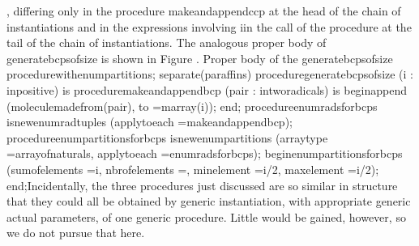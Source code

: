 \tyxffmxendmono[], differing only in the procedure %
\tyxffmxmono[]make\Symuns[]and\Symuns[]append\Symuns[]ccp%
\tyxffmxendmono[] at the head of the chain of instantiations and in
the expressions involving \tyxffmxmono[]i\tyxffmxendmono[] in the
call of the procedure at the tail of the chain of instantiations.%
\Endpara[]
\Para[]The analogous proper body of \tyxffmxmono[]generate\Symuns[]bcps\Symuns[]of\Symuns[]size%
\tyxffmxendmono[] is shown in Figure .
\Parbox[]
Proper body of
the \tyxffmxmono[]generate\Symuns[]bcps\Symuns[]of\Symuns[]size%
\tyxffmxendmono[] procedure\FgEndcap[]
\Comp[]\tyxtstxbf[]with\tyxtstxendbf[] enum\Symuns[]partitions;
\tyxtstxbf[]separate\tyxtstxendbf[] (paraffins)
\tyxtstxbf[]procedure\tyxtstxendbf[] generate\Symuns[]bcps\Symuns[]of\Symuns[]size (i : %
\tyxtstxbf[]in\tyxtstxendbf[] positive) \tyxtstxbf[]is%
\tyxtstxendbf[]
   \tyxtstxbf[]procedure\tyxtstxendbf[] make\Symuns[]and\Symuns[]append\Symuns[]bcp (pair : %
\tyxtstxbf[]in\tyxtstxendbf[] two\Symuns[]radicals) \tyxtstxbf[]is%
\tyxtstxendbf[] 
   \tyxtstxbf[]begin\tyxtstxendbf[]
      append (molecule\Symuns[]made\Symuns[]from(pair), to =\Symgt[] m\Symuns[]array(i));
   \tyxtstxbf[]end\tyxtstxendbf[];
   \tyxtstxbf[]procedure\tyxtstxendbf[] enum\Symuns[]rads\Symuns[]for\Symuns[]bcps %
\tyxtstxbf[]is\tyxtstxendbf[]
      \tyxtstxbf[]new\tyxtstxendbf[] enum\Symuns[]rad\Symuns[]tuples (apply\Symuns[]to\Symuns[]each =\Symgt[] make\Symuns[]and\Symuns[]append\Symuns[]bcp);
   \tyxtstxbf[]procedure\tyxtstxendbf[] enum\Symuns[]partitions\Symuns[]for\Symuns[]bcps %
\tyxtstxbf[]is\tyxtstxendbf[]
      \tyxtstxbf[]new\tyxtstxendbf[] enum\Symuns[]partitions (array\Symuns[]type    =\Symgt[] array\Symuns[]of\Symuns[]naturals,
                           apply\Symuns[]to\Symuns[]each =\Symgt[] enum\Symuns[]rads\Symuns[]for\Symuns[]bcps);
\tyxtstxbf[]begin\tyxtstxendbf[]
   enum\Symuns[]partitions\Symuns[]for\Symuns[]bcps (sum\Symuns[]of\Symuns[]elements =\Symgt[] i,
                             nbr\Symuns[]of\Symuns[]elements =,
                             min\Symuns[]element     =\Symgt[] i/2,
                             max\Symuns[]element     =\Symgt[] i/2);
\tyxtstxbf[]end\tyxtstxendbf[];\Endcomp[]
\EndParbox[]
\FgEndblock[]
 Incidentally, the three procedures just discussed are so similar
in structure that they could all be obtained by generic instantiation,
with appropriate generic actual parameters, of one generic procedure.
Little would be gained, however, so we do not pursue that here.%
